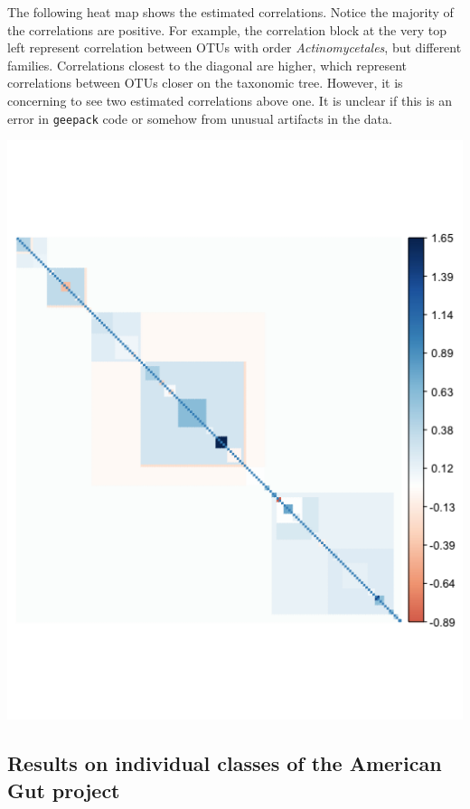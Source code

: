 \documentclass[12pt]{article}
\begin{document}
\hspace*{-\parindent}%
\begin{minipage}{.6\textwidth}
  The following heat map shows the estimated correlations. Notice the majority of the correlations are positive. For example, the correlation block at the very top left represent correlation between OTUs with order \textit{Actinomycetales}, but different families. Correlations closest to the diagonal are higher, which represent correlations between OTUs closer on the taxonomic tree. However, it is concerning to see two estimated correlations above one. It is unclear if this is an error in \texttt{geepack} code or somehow from unusual artifacts in the data.
\end{minipage}%
\begin{minipage}{0.4\textwidth}
    \centering
    \includegraphics[width = .8\textwidth]{normal_corr.png}
\end{minipage}





\subsection{Results on individual classes of the American Gut project}
\end{document}
